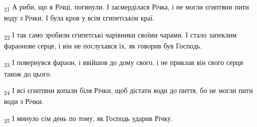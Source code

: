 \begin{tcolorbox}
\textsubscript{21} А риби, що в Річці, погинули. І засмерділася Річка, і не могли єгиптяни пити воду з Річки. І була кров у всім єгипетськім краї.
\end{tcolorbox}
\begin{tcolorbox}
\textsubscript{22} І так само зробили єгипетські чарівники своїми чарами. І стало запеклим фараонове серце, і він не послухався їх, як говорив був Господь.
\end{tcolorbox}
\begin{tcolorbox}
\textsubscript{23} І повернувся фараон, і ввійшов до дому свого, і не приклав він свого серця також до цього.
\end{tcolorbox}
\begin{tcolorbox}
\textsubscript{24} І всі єгиптяни копали біля Річки, щоб дістати води до пиття, бо не могли пити води з Річки.
\end{tcolorbox}
\begin{tcolorbox}
\textsubscript{25} І минуло сім день по тому, як Господь ударив Річку.
\end{tcolorbox}
